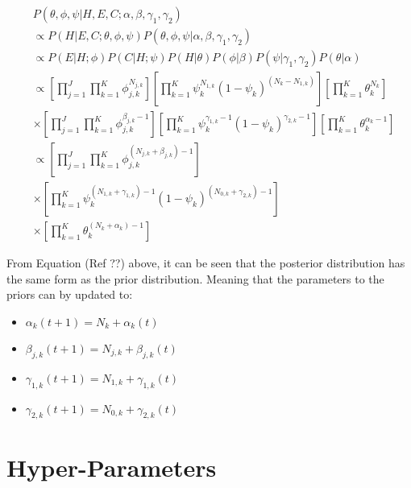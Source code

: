 \begin{equation}
    \begin{split}
& P(\theta, \phi, \psi \vert H, E, C;  \alpha, \beta, \gamma_{1}, \gamma_{2}) \\
&\propto P(H \vert E, C; \theta, \phi, \psi)P(\theta, \phi, \psi \vert \alpha, \beta, \gamma_{1}, \gamma_{2}) \\
&\propto P(E \vert H; \phi) P(C \vert H; \psi) P(H \vert \theta) P(\phi \vert \beta) P(\psi \vert \gamma_{1}, \gamma_{2}) P(\theta \vert \alpha)  \\
&\propto \left[ \prod_{j=1}^{J} \prod_{k=1}^{K} \phi_{j,k}^{N_{j,k}} \right] \left[ \prod_{k=1}^{K} \psi_{k}^{N_{1,k}} (1 - \psi_{k})^{(N_{k} - N_{1,k})} \right] \left[ \prod_{k=1}^{K} \theta_{k}^{N_{k}} \right] \\
&\times \left[ \prod_{j=1}^{J} \prod_{k=1}^{K} \phi_{j,k}^{\beta_{j,k} - 1} \right] \left[ \prod_{k=1}^{K} \psi_{k}^{\gamma_{1,k} - 1} (1 - \psi_{k})^{\gamma_{2,k} - 1} \right] \left[ \prod_{k=1}^{K} \theta_{k}^{\alpha_{k} - 1} \right] \\
&\propto \left[ \prod_{j=1}^{J} \prod_{k=1}^{K} \phi_{j,k}^{(N_{j,k} + \beta_{j,k}) - 1} \right] \\
&\times \left[ \prod_{k=1}^{K} \psi_{k}^{(N_{1,k} + \gamma_{1,k}) - 1} (1 - \psi_{k})^{(N_{0,k} + \gamma_{2,k} )- 1} \right] \\
&\times \left[ \prod_{k=1}^{K} \theta_{k}^{(N_{k} + \alpha_{k}) - 1} \right]
    \end{split}
\end{equation}

From Equation (Ref ??) above, it can be seen that the posterior distribution has the same form as the prior distribution. Meaning that the parameters to the priors can by updated to:

\begin{itemize}
    \item $\alpha_{k}(t+1) = N_{k} + \alpha_{k}(t)$
    \item $\beta_{j,k}(t+1) = N_{j,k} + \beta_{j,k}(t)$
    \item $\gamma_{1,k}(t+1) = N_{1,k} + \gamma_{1,k}(t)$
    \item $\gamma_{2,k}(t+1) = N_{0,k} + \gamma_{2,k}(t)$
\end{itemize}

\section{Hyper-Parameters}
\label{sec:bhh:hyper_parameters}

